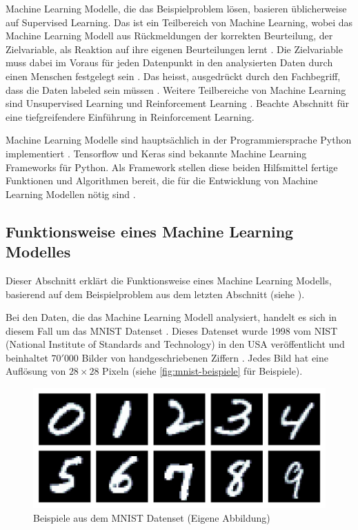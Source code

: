 Machine Learning Modelle, die das Beispielproblem lösen, basieren üblicherweise
auf Supervised Learning. Das ist ein Teilbereich von Machine Learning, wobei das
Machine Learning Modell aus Rückmeldungen der korrekten Beurteilung, der
Zielvariable, als Reaktion auf ihre eigenen Beurteilungen lernt
\cite{laurenz_wuttke_was_2021-1}. Die Zielvariable muss dabei im Voraus für jeden
Datenpunkt in den analysierten Daten durch einen Menschen festgelegt sein
\cite{trahasch_31_2020}. Das heisst, ausgedrückt durch den Fachbegriff, dass
die Daten labeled sein müssen \cite{luis_g_serrano_21_2021}. Weitere Teilbereiche
von Machine Learning sind Unsupervised Learning und Reinforcement Learning
\cite{arora_supervised_2020}. Beachte Abschnitt  für eine
tiefgreifendere Einführung in Reinforcement Learning.
 
Machine Learning Modelle sind hauptsächlich in der Programmiersprache Python
implementiert \cite{sadie_bennett_why_2019}. Tensorflow und Keras sind bekannte
Machine Learning Frameworks für Python. Als Framework stellen diese beiden
Hilfsmittel fertige Funktionen und Algorithmen bereit, die für die Entwicklung
von Machine Learning Modellen nötig sind
\cite{noauthor_tensorflow_2015}\cite{noauthor_keras_2015}.
 
 
\subsection{Funktionsweise eines Machine Learning Modelles}\label{sub:t_ml_func}
Dieser Abschnitt erklärt die Funktionsweise eines Machine Learning Modells,
basierend auf dem Beispielproblem aus dem letzten Abschnitt (siehe ).
 
Bei den Daten, die das Machine Learning Modell analysiert, handelt es sich in
diesem Fall um das MNIST Datenset \cite{yann_lecun_mnist_nodate}. Dieses Datenset
wurde 1998 vom NIST (National Institute of Standards and Technology) in den USA
veröffentlicht und beinhaltet $70'000$ Bilder von handgeschriebenen Ziffern
\cite{yann_lecun_papers_nodate}. Jedes Bild hat eine Auflösung von $28\times28$
Pixeln (siehe \autoref{fig:mnist-beispiele} für Beispiele).
 
\begin{figure}[!ht]
   \centering
   \includegraphics[width=\textwidth]{images/theorie/mnist-beispiele.png}
   \caption{Beispiele aus dem MNIST Datenset (Eigene Abbildung)}\label{fig:mnist-beispiele}
\end{figure}
 
